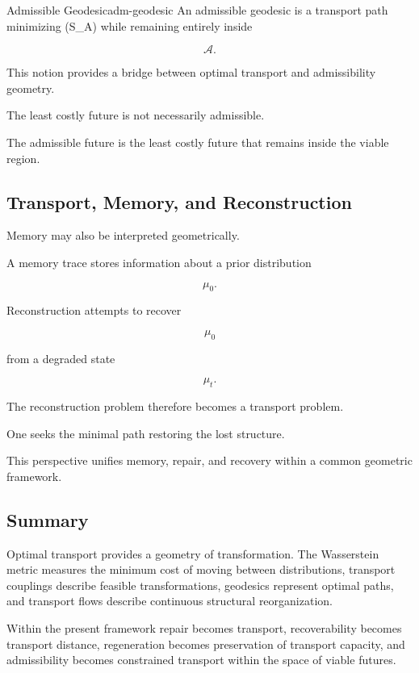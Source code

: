 \documentclass[12pt,twoside,openright]{book}
\begin{document}
\begin{definition}{Admissible Geodesic}{adm-geodesic}
An admissible geodesic is a transport path minimizing
(\mathcal S_A) while remaining entirely inside

\[
\mathcal A.
\]
\end{definition}

This notion provides a bridge between optimal transport
and admissibility geometry.

The least costly future is not necessarily admissible.

The admissible future is the least costly future that
remains inside the viable region.

\subsection{Transport, Memory, and Reconstruction}

Memory may also be interpreted geometrically.

A memory trace stores information about a prior
distribution

\[
\mu_0.
\]

Reconstruction attempts to recover

\[
\mu_0
\]

from a degraded state

\[
\mu_t.
\]

The reconstruction problem therefore becomes a transport
problem.

One seeks the minimal path restoring the lost structure.

This perspective unifies memory, repair, and recovery
within a common geometric framework.

\subsection{Summary}

Optimal transport provides a geometry of transformation.
The Wasserstein metric measures the minimum cost of moving
between distributions, transport couplings describe
feasible transformations, geodesics represent optimal
paths, and transport flows describe continuous structural
reorganization.

Within the present framework repair becomes transport,
recoverability becomes transport distance, regeneration
becomes preservation of transport capacity, and
admissibility becomes constrained transport within the
space of viable futures.
\end{document}
